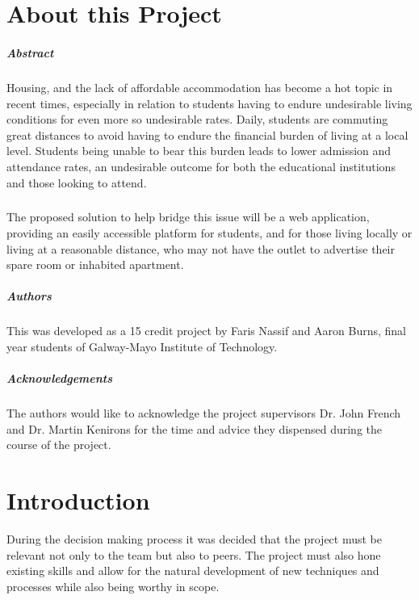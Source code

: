 \chapter*{About this Project}
\paragraph{Abstract}
Housing, and the lack of affordable accommodation has become a hot topic in recent times, especially in relation to students having to endure undesirable living conditions for even more so undesirable rates. Daily, students are commuting great distances to avoid having to endure the financial burden of living at a local level. Students being unable to bear this burden leads to lower admission and attendance rates, an undesirable outcome for both the educational institutions and those looking to attend.

\paragraph{}
The proposed solution to help bridge this issue will be a web application, providing an easily accessible platform for students, and for those living locally or living at a reasonable distance, who may not have the outlet to advertise their spare room or inhabited apartment. 

\paragraph{Authors}
This was developed as a 15 credit project by Faris Nassif and Aaron Burns, final year students of Galway-Mayo Institute of Technology.

\paragraph{Acknowledgements}
The authors would like to acknowledge the project supervisors Dr. John French and Dr. Martin Kenirons for the time and advice they dispensed during the course of the project.

\chapter{Introduction}
During the decision making process it was decided that the project must be relevant not only to the team but also to peers. The project must also hone existing skills and allow for the natural development of new techniques and processes while also being worthy in scope. 


